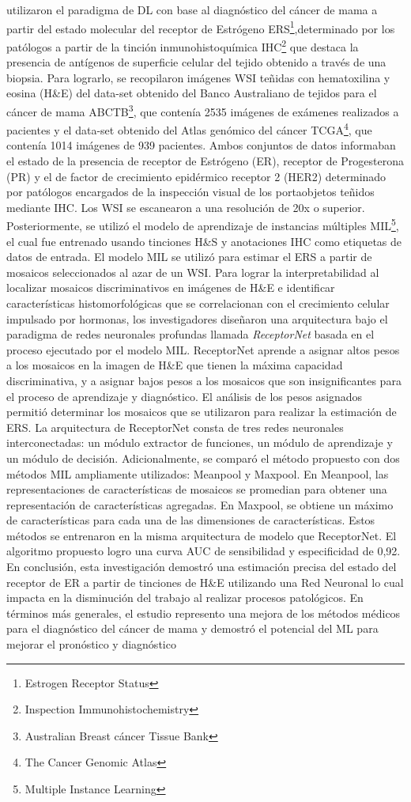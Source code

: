 \cite{Naik2020} utilizaron el paradigma de DL con base al diagnóstico del cáncer de mama a partir del estado molecular del receptor de Estrógeno ERS\footnote{Estrogen Receptor Status},determinado por los patólogos a partir de la tinción inmunohistoquímica IHC\footnote{Inspection Immunohistochemistry} que destaca la presencia de antígenos de superficie celular del tejido obtenido a través de una biopsia. Para lograrlo, se recopilaron imágenes WSI teñidas con hematoxilina y eosina (H\&E) del data-set obtenido del Banco Australiano de tejidos para el cáncer de mama ABCTB\footnote{Australian Breast cáncer Tissue Bank}, que contenía 2535 imágenes de exámenes realizados  a pacientes y el data-set obtenido del Atlas genómico del cáncer TCGA\footnote{The Cancer Genomic Atlas}, que contenía 1014 imágenes de 939 pacientes. Ambos conjuntos de datos informaban el estado de la presencia de receptor de Estrógeno (ER), receptor de Progesterona (PR) y el de factor de crecimiento epidérmico receptor 2 (HER2) determinado por patólogos encargados de la inspección visual de los portaobjetos teñidos mediante IHC. Los WSI se escanearon a una resolución de 20x o superior. Posteriormente, se utilizó el modelo de aprendizaje de instancias múltiples MIL\footnote{Multiple Instance Learning}, el cual fue entrenado usando tinciones H\&S y anotaciones IHC como etiquetas de datos de entrada. El modelo MIL se utilizó para estimar el ERS a partir de mosaicos seleccionados al azar de un WSI. Para lograr la interpretabilidad al localizar mosaicos discriminativos en imágenes de H\&E e identificar características histomorfológicas que se correlacionan con el crecimiento celular impulsado por hormonas, los investigadores diseñaron una arquitectura bajo el paradigma de redes neuronales profundas llamada \textit{ReceptorNet} basada en el proceso ejecutado por el modelo MIL. ReceptorNet aprende a asignar altos pesos a los mosaicos en la imagen de H\&E que tienen la máxima capacidad discriminativa, y a asignar bajos pesos a los mosaicos que son insignificantes para el proceso de aprendizaje y diagnóstico. El análisis de los pesos asignados permitió determinar los mosaicos que se utilizaron para realizar la estimación de ERS.  La arquitectura de ReceptorNet consta de tres redes neuronales interconectadas: un módulo extractor de funciones, un módulo de aprendizaje y un módulo de decisión. Adicionalmente, se comparó el método propuesto con dos métodos MIL ampliamente utilizados: Meanpool y Maxpool. En Meanpool, las representaciones de características de mosaicos se promedian para obtener una representación de características agregadas. En Maxpool, se obtiene un máximo de características para cada una de las dimensiones de características. Estos métodos se entrenaron en la misma arquitectura de modelo que ReceptorNet. El algoritmo propuesto logro una curva AUC de sensibilidad y especificidad de 0,92. En conclusión, esta investigación demostró una estimación precisa del estado del receptor de ER a partir de tinciones de H\&E utilizando una Red Neuronal lo cual impacta en la disminución del trabajo al realizar procesos patológicos. En términos más generales, el estudio represento una mejora de los métodos médicos para el diagnóstico del cáncer de mama y demostró el potencial del ML para mejorar el pronóstico y diagnóstico 